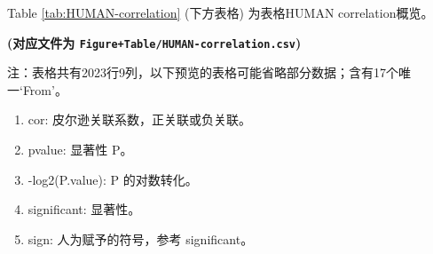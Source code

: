 \documentclass[
]{article}
\providecommand{\tightlist}{%
  \setlength{\itemsep}{0pt}\setlength{\parskip}{0pt}}
\begin{document}
Table \ref{tab:HUMAN-correlation} (下方表格) 为表格HUMAN correlation概览。

\textbf{(对应文件为 \texttt{Figure+Table/HUMAN-correlation.csv})}

\begin{center}\begin{tcolorbox}[colback=gray!10, colframe=gray!50, width=0.9\linewidth, arc=1mm, boxrule=0.5pt]注：表格共有2023行9列，以下预览的表格可能省略部分数据；含有17个唯一`From'。
\end{tcolorbox}
\end{center}
\begin{center}\begin{tcolorbox}[colback=gray!10, colframe=gray!50, width=0.9\linewidth, arc=1mm, boxrule=0.5pt]\begin{enumerate}\tightlist
\item cor:  皮尔逊关联系数，正关联或负关联。
\item pvalue:  显著性 P。
\item -log2(P.value):  P 的对数转化。
\item significant:  显著性。
\item sign:  人为赋予的符号，参考 significant。
\end{enumerate}\end{tcolorbox}
\end{center}
\end{document}
